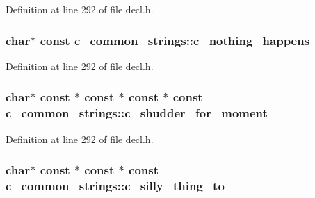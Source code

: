 Definition at line 292 of file decl.\+h.

\hypertarget{structc__common__strings_a7e7ac157e14bb8c42fea2407591e7687}{
\subsubsection[{c\+\_\+nothing\+\_\+happens}]{ char$\ast$ {\bf const} c\+\_\+common\+\_\+strings\+::c\+\_\+nothing\+\_\+happens}}\label{structc__common__strings_a7e7ac157e14bb8c42fea2407591e7687}


Definition at line 292 of file decl.\+h.

\hypertarget{structc__common__strings_a4bac587af4d082c8e91091d32fff01b8}{
\subsubsection[{c\+\_\+shudder\+\_\+for\+\_\+moment}]{ char$\ast$ {\bf const} $\ast$ {\bf const} $\ast$ {\bf const} $\ast$ {\bf const} c\+\_\+common\+\_\+strings\+::c\+\_\+shudder\+\_\+for\+\_\+moment}}\label{structc__common__strings_a4bac587af4d082c8e91091d32fff01b8}


Definition at line 292 of file decl.\+h.

\hypertarget{structc__common__strings_aeba96d6c0937a9dcba076c5634e324f6}{
\subsubsection[{c\+\_\+silly\+\_\+thing\+\_\+to}]{ char$\ast$ {\bf const} $\ast$ {\bf const} $\ast$ {\bf const} c\+\_\+common\+\_\+strings\+::c\+\_\+silly\+\_\+thing\+\_\+to}}\label{structc__common__strings_aeba96d6c0937a9dcba076c5634e324f6}


